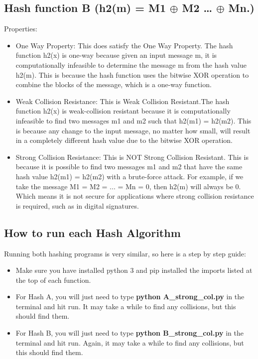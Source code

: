 \documentclass[10pt]{article}
\begin{document}
\subsection{Hash function B (h2(m) = M1 $\oplus$ M2 … $\oplus$ Mn.)}
\noindent Properties:
\begin{itemize}
	\item One Way Property: This does satisfy the One Way Property. The hash function h2(x) is one-way because given an input message m, it is computationally infeasible to determine the message m from the hash value h2(m). This is because the hash function uses the bitwise XOR operation to combine the blocks of the message, which is a one-way function.
	
	
	\item Weak Collision Resistance: This is Weak Collision Resistant.The hash function h2(x) is weak-collision resistant because it is computationally infeasible to find two messages m1 and m2 such that h2(m1) = h2(m2). This is because any change to the input message, no matter how small, will result in a completely different hash value due to the bitwise XOR operation.
	
	
	\item Strong Collision Resistance: This is NOT Strong Collision Resistant. This is because it is possible to find two messages m1 and m2 that have the same hash value h2(m1) = h2(m2) with a brute-force attack. For example, if we take the message M1 = M2 = ... = Mn = 0, then h2(m) will always be 0. Which means it is not secure for applications where strong collision resistance is required, such as in digital signatures.
	
\end{itemize}


\subsection{How to run each Hash Algorithm}
\noindent Running both hashing programs is very similar, so here is a step by step guide:
\begin{itemize}
	\item Make sure you have installed python 3 and pip installed the imports listed at the top of each function. 
	\item For Hash A, you will just need to type \textbf{python A\_strong\_col.py} in the terminal and hit run. It may take a while to find any collisions, but this should find them.
	\item For Hash B, you will just need to type \textbf{python B\_strong\_col.py} in the terminal and hit run. Again, it may take a while to find any collisions, but this should find them.
\end{itemize}
\end{document}
